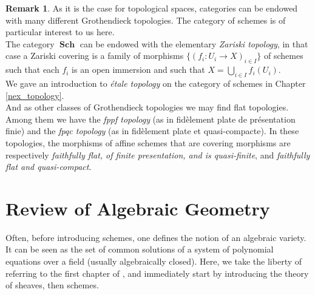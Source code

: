 \documentclass{article}
\theoremstyle{plain}
\theoremstyle{definition}
\newtheorem{remark}{Remark}
\DeclareMathOperator{\Sch}{\textbf{Sch}}
\begin{document}
\begin{remark}
    As it is the case for topological spaces, categories can be endowed with many different Grothendieck topologies.
    The category of schemes is of particular interest to us here.\\
    The category $\Sch$ can be endowed with the elementary \textit{Zariski topology}, in that case a Zariski covering is a family of morphisms $\{(f_i:U_i \rightarrow X)_{i\in I}\}$ of schemes such that each $f_i$ is an open immersion and such that $X =\bigcup_{i\in I} f_i(U_i)$.\\
    We gave an introduction to \textit{\'etale topology} on the category of schemes in Chapter \ref{nex_topology}.\\
    And as other classes of Grothendieck topologies we may find flat topologies. 
    Among them we have the \textit{fppf topology} (as in fid\`element plate de pr\'esentation finie) and the  \textit{fpqc topology} (as in fid\`element plate et quasi-compacte).
    In these topologies, the morphisms of affine schemes that are covering morphisms are respectively  \textit{faithfully flat, of finite presentation, and is quasi-finite}, and \textit{faithfully flat and quasi-compact}.\\
\end{remark}











\section{Review of Algebraic Geometry}

Often, before introducing schemes, one defines the notion of an algebraic variety.
It can be seen as the set of common solutions of a system of polynomial equations over a field (usually algebraically closed). 
Here, we take the liberty of referring to the first chapter of \cite{Hartshorne}, and immediately start by introducing the theory of sheaves, then schemes.\\
\end{document}
